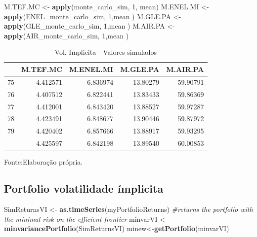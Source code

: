 \documentclass[
  12pt,
  a4paper,
  openany]{book}
\newenvironment{Shaded}{\begin{snugshade}}{\end{snugshade}}
\newcommand{\CommentTok}[1]{\textcolor[rgb]{0.56,0.35,0.01}{\textit{#1}}}
\newcommand{\DecValTok}[1]{\textcolor[rgb]{0.00,0.00,0.81}{#1}}
\newcommand{\KeywordTok}[1]{\textcolor[rgb]{0.13,0.29,0.53}{\textbf{#1}}}
\newcommand{\NormalTok}[1]{#1}
\newcommand{\StringTok}[1]{\textcolor[rgb]{0.31,0.60,0.02}{#1}}
\begin{document}
\scriptsize

\begin{Shaded}
\begin{Highlighting}[]
\NormalTok{M.TEF.MC \textless{}{-}}\StringTok{ }\KeywordTok{apply}\NormalTok{(monte\_carlo\_sim, }\DecValTok{1}\NormalTok{, mean)}
\NormalTok{M.ENEL.MI \textless{}{-}}\StringTok{ }\KeywordTok{apply}\NormalTok{(ENEL\_monte\_carlo\_sim, }\DecValTok{1}\NormalTok{,mean )}
\NormalTok{M.GLE.PA \textless{}{-}}\StringTok{ }\KeywordTok{apply}\NormalTok{(GLE\_monte\_carlo\_sim, }\DecValTok{1}\NormalTok{,mean )}
\NormalTok{M.AIR.PA \textless{}{-}}\StringTok{ }\KeywordTok{apply}\NormalTok{(AIR\_monte\_carlo\_sim, }\DecValTok{1}\NormalTok{,mean )}
\end{Highlighting}
\end{Shaded}

\normalsize
\begin{table}[!h]

\caption{\label{tab:unnamed-chunk-53}Vol. Implicita - Valores simulados}
\centering
\begin{tabular}[t]{lrrrr}
\toprule
  & M.TEF.MC & M.ENEL.MI & M.GLE.PA & M.AIR.PA\\
\midrule
75 & 4.412571 & 6.836974 & 13.80279 & 59.90791\\
76 & 4.407512 & 6.822441 & 13.83433 & 59.86369\\
77 & 4.412001 & 6.843420 & 13.88527 & 59.97287\\
78 & 4.423491 & 6.848677 & 13.90446 & 59.87972\\
79 & 4.420402 & 6.857666 & 13.88917 & 59.93295\\
\addlinespace
80 & 4.425597 & 6.842198 & 13.89540 & 60.00853\\
\bottomrule
\end{tabular}
\end{table}
\FloatBarrier
\centering

Fonte:Elaboração própria.

\justifying
\bigskip

\hypertarget{portfolio-volatilidade-uxedmplicita}{%
\subsection{Portfolio volatilidade ímplicita}\label{portfolio-volatilidade-uxedmplicita}}

\scriptsize

\begin{Shaded}
\begin{Highlighting}[]
\NormalTok{SimReturnsVI \textless{}{-}}\StringTok{ }\KeywordTok{as.timeSeries}\NormalTok{(myPortfolioReturns)}
\CommentTok{\#returns the portfolio with the minimal risk on the efficient frontier}
\NormalTok{minvarVI \textless{}{-}}\StringTok{ }\KeywordTok{minvariancePortfolio}\NormalTok{(SimReturnsVI) }
\NormalTok{minew\textless{}{-}}\KeywordTok{getPortfolio}\NormalTok{(minvarVI)}
\end{Highlighting}
\end{Shaded}
\end{document}
